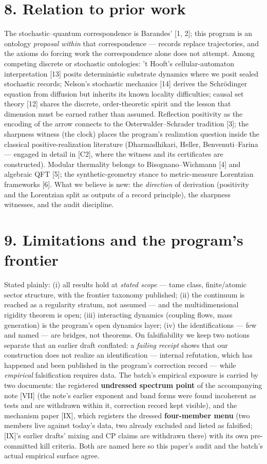 \documentclass[11pt]{article}
\begin{document}
\section*{8. Relation to prior work}
The stochastic–quantum correspondence is Barandes' [1, 2]; this program is an ontology \emph{proposal within} that correspondence — records replace trajectories, and the axioms do forcing work the correspondence alone does not attempt.  Among competing discrete or stochastic ontologies: 't Hooft's cellular-automaton interpretation [13] posits deterministic substrate dynamics where we posit sealed stochastic records; Nelson's stochastic mechanics [14] derives the Schrödinger equation from diffusion but inherits its known locality difficulties; causal set theory [12] shares the discrete, order-theoretic spirit and the lesson that dimension must be earned rather than assumed.  Reflection positivity as the encoding of the arrow connects to the Osterwalder–Schrader tradition [3]; the sharpness witness (the clock) places the program's realization question inside the classical positive-realization literature (Dharmadhikari, Heller, Benvenuti–Farina — engaged in detail in [C2], where the witness and its certificates are constructed). Modular thermality belongs to Bisognano–Wichmann [4] and algebraic QFT [5]; the synthetic-geometry stance to metric-measure Lorentzian frameworks [6].  What we believe is new: the \emph{direction} of derivation (positivity and the Lorentzian split as outputs of a record principle), the sharpness witnesses, and the audit discipline.

\section*{9. Limitations and the program's frontier}
Stated plainly: (i) all results hold at \emph{stated scope} — tame class, finite/atomic sector structure, with the frontier taxonomy published; (ii) the continuum is reached as a regularity stratum, not assumed — and the multidimensional rigidity theorem is open; (iii) interacting dynamics (coupling flows, mass generation) is the program's open dynamics layer; (iv) the identifications — few and named — are bridges, not theorems.  On falsifiability we keep two notions separate that an earlier draft conflated: a \emph{failing receipt} shows that our construction does not realize an identification — internal refutation, which has happened and been published in the program's correction record — while \emph{empirical} falsification requires data.  The batch's empirical exposure is carried by two documents: the registered \textbf{undressed spectrum point} of the accompanying note [VII] (the note's earlier exponent and band forms were found incoherent as tests and are withdrawn within it, correction record kept visible), and the mechanism paper [IX], which registers the dressed \textbf{four-member menu} (two members live against today's data, two already excluded and listed as falsified; [IX]'s earlier drafts' mixing and CP claims are withdrawn there) with its own pre-committed kill criteria.  Both are named here so this paper's audit and the batch's actual empirical surface agree.
\end{document}
